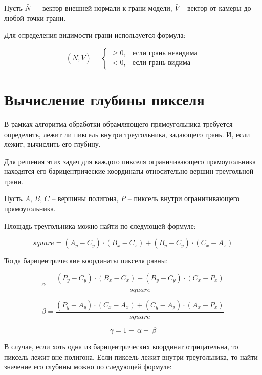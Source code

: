 Пусть
$\bar{N}$ --- вектор внешней нормали к грани модели,
$\bar{V}$ – вектор от камеры до любой точки грани.

Для определения видимости грани используется формула:

\begin{equation}
	(\bar{N},\bar{V})=
	\begin{cases}
		\geq 0, & \text{если грань невидима} \\
		< 0,   & \text{если грань видима}
	\end{cases}
\end{equation}

\section{Вычисление глубины пикселя}

В рамках алгоритма обработки обрамляющего прямоугольника требуется определить, лежит ли пиксель внутри треугольника, задающего грань. И, если лежит, вычислить его глубину.

Для решения этих задач для каждого пикселя ограничивающего прямоугольника находятся его барицентрические координаты относительно вершин треугольной грани.

Пусть $A$, $B$, $C$ – вершины полигона, $P$ – пиксель внутри ограничивающего прямоугольника.

Площадь треугольника можно найти по следующей формуле:

\begin{equation}
	square=\left(A_y-C_y\right)\cdot\left(B_x-C_x\right)+\left(B_y-C_y\right)\cdot\left(C_x-A_x\right)
\end{equation}

Тогда барицентрические координаты пикселя равны:

\begin{equation}
	\alpha=\frac{\left(P_y-C_y\right)\cdot\left(B_x-C_x\right)+\left(B_y-C_y\right)\cdot\left(C_x-P_x\right)}{square}
\end{equation}	

\begin{equation}
	\beta=\frac{\left(P_y-A_y\right)\cdot\left(C_x-A_x\right)+\left(C_y-A_y\right)\cdot\left(A_x-P_x\right)}{square}
\end{equation}

\begin{equation}
	\gamma=1-\ \alpha-\ \beta
\end{equation}

В случае, если хоть одна из барицентрических координат отрицательна, то пиксель лежит вне полигона. Если пиксель лежит внутри треугольника, то найти значение его глубины можно по следующей формуле:

